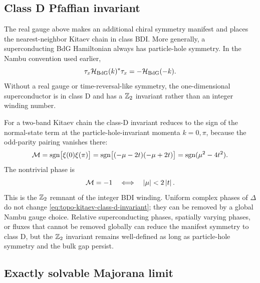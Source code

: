 \subsection{Class D Pfaffian invariant}
\label{subsec:topo-class-d-pfaffian}

The real gauge above makes an additional chiral symmetry manifest and places the
nearest-neighbor Kitaev chain in class BDI.  More generally, a superconducting
BdG Hamiltonian always has particle-hole symmetry.  In the Nambu convention
used earlier,
\begin{equation}
\label{eq:topo-phs-condition}
    \tau_x\mathcal{H}_{\rm BdG}(k)^*\tau_x=-\mathcal{H}_{\rm BdG}(-k).
\end{equation}
Without a real gauge or time-reversal-like symmetry, the one-dimensional
superconductor is in class D and has a $\mathbb{Z}_2$ invariant rather than an integer
winding number.

For a two-band Kitaev chain the class-D invariant reduces to the sign of the
normal-state term at the particle-hole-invariant momenta $k=0,\pi$, because the
odd-parity pairing vanishes there:
\begin{equation}
\label{eq:topo-kitaev-class-d-invariant}
    \mathcal{M}
    =
    \operatorname{sgn}\bigl[\xi(0)\xi(\pi)\bigr]
    =
    \operatorname{sgn}\bigl[(-\mu-2t)(-\mu+2t)\bigr]
    =
    \operatorname{sgn}(\mu^2-4t^2).
\end{equation}
The nontrivial phase is
\begin{equation}
\label{eq:topo-class-d-nontrivial-condition}
    \mathcal{M}=-1
    \quad\Longleftrightarrow\quad
    \left|\mu\right|<2\left|t\right|.
\end{equation}
This is the $\mathbb{Z}_2$ remnant of the integer BDI winding.  Uniform complex phases
of $\Delta$ do not change \cref{eq:topo-kitaev-class-d-invariant}; they can be
removed by a global Nambu gauge choice.  Relative superconducting phases,
spatially varying phases, or fluxes that cannot be removed globally can reduce
the manifest symmetry to class D, but the $\mathbb{Z}_2$ invariant remains well-defined
as long as particle-hole symmetry and the bulk gap persist.

\subsection{Exactly solvable Majorana limit}
\label{subsec:topo-majorana-edge-limit}

